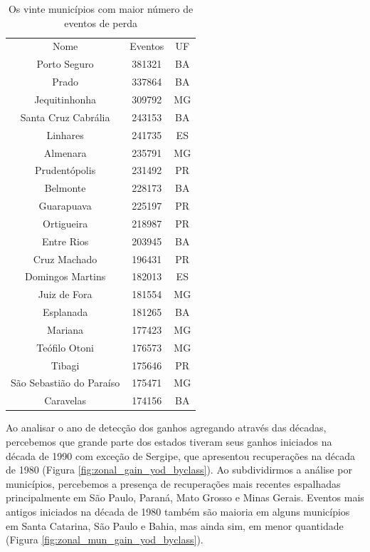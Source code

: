 \begin{table}[H]
    \centering
    \begin{tabular}{|c | c | c|}
    \hline
                            Nome & Eventos & UF \\
                Porto Seguro & 381321 & BA \\ 
                       Prado & 337864 & BA \\
                Jequitinhonha & 309792 & MG \\
        Santa Cruz Cabrália & 243153 & BA \\
                    Linhares & 241735 & ES \\
                      Almenara & 235791 & MG \\
              Prudentópolis & 231492 & PR \\
                    Belmonte & 228173 & BA \\
                  Guarapuava & 225197 & PR \\
                  Ortigueira & 218987 & PR \\
                  Entre Rios & 203945 & BA \\
                   Cruz Machado & 196431 & PR \\
            Domingos Martins & 182013 & ES \\
                 Juiz de Fora & 181554 & MG \\
                   Esplanada & 181265 & BA \\
                      Mariana & 177423 & MG \\
               Teófilo Otoni & 176573 & MG \\
                      Tibagi & 175646 & PR \\
  São Sebastião do Paraíso & 175471 & MG \\
                   Caravelas & 174156 & BA \\
    \hline
    \end{tabular}
    \caption{Os vinte municípios com maior número de eventos de perda}
    \label{tab:mun_gain}
\end{table}


Ao analisar o ano de detecção dos ganhos agregando através das décadas, percebemos que grande parte dos estados tiveram seus ganhos iniciados na década de 1990 com exceção de Sergipe, que apresentou recuperações na década de 1980 (Figura \ref{fig:zonal_gain_yod_byclass}). Ao subdividirmos a análise por municípios, percebemos a presença de recuperações mais recentes espalhadas principalmente em São Paulo, Paraná, Mato Grosso e Minas Gerais. Eventos mais antigos iniciados na década de 1980 também são maioria em alguns municípios em Santa Catarina, São Paulo e Bahia, mas ainda sim, em menor quantidade (Figura \ref{fig:zonal_mun_gain_yod_byclass}).  

